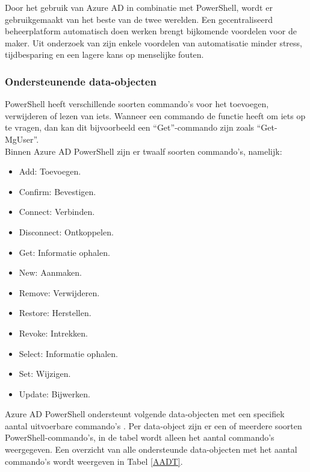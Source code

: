 Door het gebruik van Azure \ac{AD} in combinatie met PowerShell, wordt er gebruikgemaakt van het beste van de twee werelden. Een gecentraliseerd beheerplatform automatisch doen werken brengt bijkomende voordelen voor de maker. Uit onderzoek van \textcite{Breton2003} zijn enkele voordelen van automatisatie minder stress, tijdbesparing en een lagere kans op menselijke fouten.

\subsubsection{Ondersteunende data-objecten}

PowerShell heeft verschillende soorten commando's voor het toevoegen, verwijderen of lezen van iets. Wanneer een commando de functie heeft om iets op te vragen, dan kan dit bijvoorbeeld een “Get”-commando zijn zoals “Get-MgUser”. \\

Binnen Azure AD PowerShell zijn er twaalf soorten commando's, namelijk:

\begin{itemize}
    \item Add: Toevoegen.
    \item Confirm: Bevestigen.
    \item Connect: Verbinden.
    \item Disconnect: Ontkoppelen.
    \item Get: Informatie ophalen.
    \item New: Aanmaken.
    \item Remove: Verwijderen.
    \item Restore: Herstellen.
    \item Revoke: Intrekken.
    \item Select: Informatie ophalen.
    \item Set: Wijzigen.
    \item Update: Bijwerken.
\end{itemize}

Azure AD PowerShell ondersteunt volgende data-objecten met een specifiek aantal uitvoerbare commando's \autocite{Microsoft2023i}. Per data-object zijn er een of meerdere soorten PowerShell-commando's, in de tabel wordt alleen het aantal commando's weergegeven. Een overzicht van alle ondersteunde data-objecten met het aantal commando's wordt weergeven in Tabel \ref{AADT}. 

